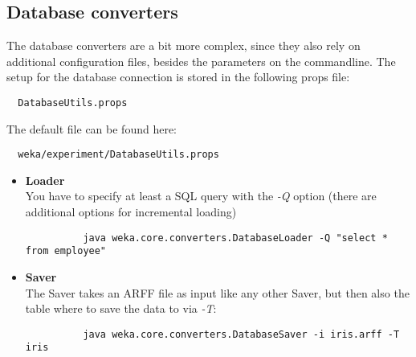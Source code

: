 \subsection{Database converters}
The database converters are a bit more complex, since they also rely on additional configuration files, besides the parameters on the commandline. The setup for the database connection is stored in the following props file:

\begin{verbatim}
  DatabaseUtils.props
\end{verbatim}

\noindent The default file can be found here:
\begin{verbatim}
  weka/experiment/DatabaseUtils.props
\end{verbatim}

\begin{itemize}
	\item \textbf{Loader} \\
		You have to specify at least a SQL query with the \textit{-Q} option (there are additional options for incremental loading)
		\begin{verbatim}
		  java weka.core.converters.DatabaseLoader -Q "select * from employee"
		\end{verbatim}
	\item \textbf{Saver} \\
		The Saver takes an ARFF file as input like any other Saver, but then also the table where to save the data to via \textit{-T}:
		\begin{verbatim}
 		  java weka.core.converters.DatabaseSaver -i iris.arff -T iris
		\end{verbatim}
\end{itemize}
